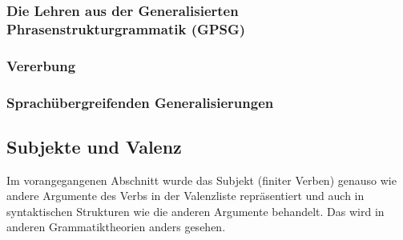 \subsubsection{Die Lehren aus der Generalisierten Phrasenstrukturgrammatik (GPSG)}



\subsubsection{Vererbung}

\subsubsection{Sprachübergreifenden Generalisierungen}



\subsection{Subjekte und Valenz}

Im vorangegangenen Abschnitt wurde das Subjekt (finiter Verben) genauso wie andere Argumente des Verbs
in der Valenzliste repräsentiert und auch in syntaktischen Strukturen wie die anderen
Argumente behandelt. Das wird in anderen Grammatiktheorien anders gesehen.


